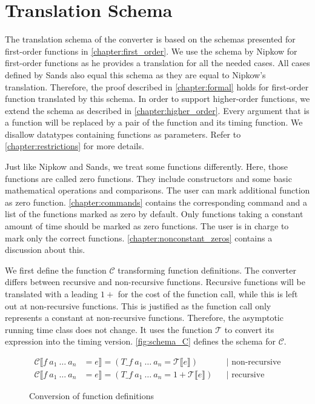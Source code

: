 
\section{Translation Schema} \label{chapter:impl_schema}

The translation schema of the converter is based on the schemas presented for first-order functions in \autoref{chapter:first_order}.
We use the schema by Nipkow \parencite{fds} for first-order functions as he provides a translation for all the needed cases.
All cases defined by Sands also equal this schema \parencite{sands} as they are equal to Nipkow's translation.
Therefore, the proof described in \autoref{chapter:formal} holds for first-order function translated by this schema.
In order to support higher-order functions, we extend the schema as described in \autoref{chapter:higher_order}.
Every argument that is a function will be replaced by a pair of the function and its timing function.
We disallow datatypes containing functions as parameters.
Refer to \autoref{chapter:restrictions} for more details.

Just like Nipkow and Sands, we treat some functions differently.
Here, those functions are called zero functions.
They include constructors and some basic mathematical operations and comparisons.
The user can mark additional function as zero function.
\autoref{chapter:commands} contains the corresponding command and a list of the functions marked as zero by default.
Only functions taking a constant amount of time should be marked as zero functions.
The user is in charge to mark only the correct functions.
\autoref{chapter:nonconstant_zeros} contains a discussion about this.

We first define the function $\mathcal{C}$ transforming function definitions.
The converter differs between recursive and non-recursive functions.
Recursive functions will be translated with a leading $1+$ for the cost of the function call, while this is left out at non-recursive functions.
This is justified as the function call only represents a constant at non-recursive functions.
Therefore, the asymptotic running time class does not change.
It uses the function $\mathcal{T}$ to convert its expression into the timing version.
\autoref{fig:schema_C} defines the schema for $\mathcal{C}$.
\begin{figure}
  \begin{align*}
    \mathcal{C}\llbracket f\ a_1\ \dots\ a_n &= e\rrbracket = (T\_f\ a_{1}\ \dots\ a_{n} = \mathcal{T}\llbracket e\rrbracket) &&\text{| non-recursive}\\
    \mathcal{C}\llbracket f\ a_1\ \dots\ a_n &= e\rrbracket = (T\_f\ a_{1}\ \dots\ a_{n} = 1 + \mathcal{T}\llbracket e\rrbracket) &&\text{| recursive}
  \end{align*}
  \caption{Conversion of function definitions}
  \label{fig:schema_C}
\end{figure}

